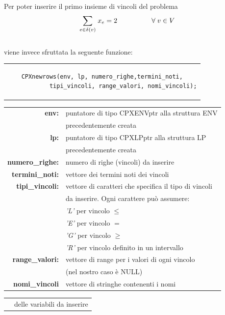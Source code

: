 Per poter inserire il primo insieme di vincoli del problema\\
$$
\underset{e\in \delta(v)}\sum{\;x_e} = 2\;\;\;\;\;\;\;\;\;\;\;\;\;\;\;\;\;\;\forall\;v\in V \\\\
$$
\\
viene invece sfruttata la seguente funzione:
\begin{center}
\begin{tabular}{c}
\begin{lstlisting}[linewidth=330pt, basicstyle=\footnotesize\sffamily,]     
 CPXnewrows(env, lp, numero_righe,termini_noti,
            tipi_vincoli, range_valori, nomi_vincoli);
\end{lstlisting}
\end{tabular}
\end{center}
\begin{table}[h]
\centering
\begin{tabular}{rl}
\textbf{env:} & {puntatore di tipo CPXENVptr alla struttura ENV}\\
& {precedentemente creata}\\
\textbf{lp:} & {puntatore di tipo CPXLPptr alla struttura LP}\\
& {precedentemente creata}\\
\textbf{numero\_righe:} & {numero di righe (vincoli) da inserire}\\
\textbf{termini\_noti:} & {vettore dei termini noti dei vincoli}\\
\textbf{tipi\_vincoli:} & {vettore di caratteri che specifica il tipo di vincoli}\\
&{da inserire. Ogni carattere può assumere:}\\
&{\textit{'L'} per vincolo $\leq$}\\
&{\textit{'E'} per vincolo $=$}\\
&{\textit{'G'} per vincolo $\geq$}\\
&{\textit{'R'} per vincolo definito in un intervallo}\\
\textbf{range\_valori:} & {vettore di range per i valori di ogni vincolo}\\
& {(nel nostro caso è NULL)} \\
\textbf{nomi\_vincoli} & vettore di stringhe contenenti i nomi  \\
\end{tabular}
\end{table}
\begin{table}[h]
\centering
\begin{tabular}{rl}
& delle variabili da inserire
\end{tabular}
\end{table}
